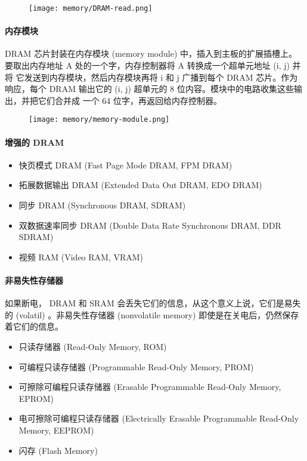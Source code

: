\begin{figure}[H]
    \centering
    \texttt{[image: memory/DRAM-read.png]}
\end{figure}

\paragraph{内存模块}
DRAM 芯片封装在内存模块 (memory module) 中，插入到主板的扩展插槽上。
要取出内存地址 A 处的一个字，内存控制器将 A 转换成一个超单元地址 (i, j) 并将
它发送到内存模块，然后内存模块再将 i 和 j 广播到每个 DRAM 芯片。作为响应，每个
DRAM 输出它的 (i, j) 超单元的 8 位内容。模块中的电路收集这些输出，并把它们合并成
一个 64 位字，再返回给内存控制器。
\begin{figure}[H]
    \centering
    \texttt{[image: memory/memory-module.png]}
\end{figure}

\paragraph{增强的 DRAM}
\begin{itemize}
    \item 快页模式 DRAM (Fast Page Mode DRAM, FPM DRAM)
    \item 拓展数据输出 DRAM (Extended Data Out DRAM, EDO DRAM)
    \item 同步 DRAM (Synchronous DRAM, SDRAM)
    \item 双数据速率同步 DRAM (Double Data Rate Synchronous DRAM, DDR SDRAM)
    \item 视频 RAM (Video RAM, VRAM)
\end{itemize}

\paragraph{非易失性存储器}
如果断电， DRAM 和 SRAM 会丢失它们的信息，从这个意义上说，它们是易失的
(volatil) 。非易失性存储器 (nonvolatile memory) 即使是在关电后，仍然保存
着它们的信息。
\begin{itemize}
    \item 只读存储器 (Read-Only Memory, ROM)
    \item 可编程只读存储器 (Programmable Read-Only Memory, PROM)
    \item 可擦除可编程只读存储器 (Erasable Programmable Read-Only Memory, EPROM)
    \item 电可擦除可编程只读存储器 (Electrically Erasable Programmable Read-Only Memory, EEPROM)
    \item 闪存 (Flash Memory)
\end{itemize}

